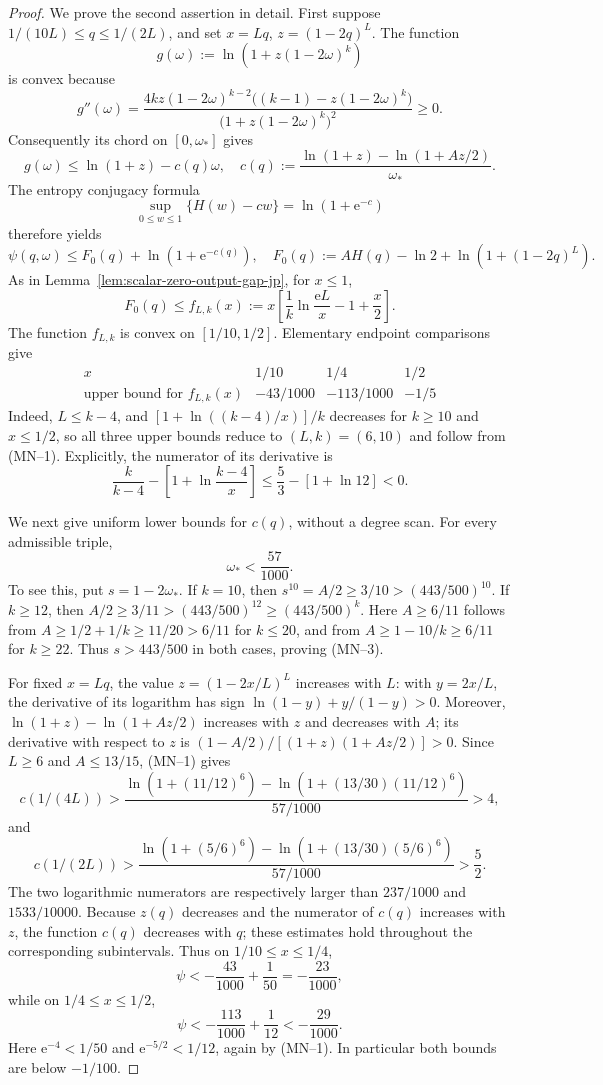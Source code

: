 \documentclass[10pt,a4paper]{amsart}
\begin{document}
\begin{proof}
We prove the second assertion in detail.  First suppose
\(1/(10L)\le q\le1/(2L)\), and set \(x=Lq\),
\(z=(1-2q)^L\).  The function
\[
g(\omega):=\ln\!\left(1+z(1-2\omega)^k\right)
\]
is convex because
\[
g''(\omega)=
\frac{4kz(1-2\omega)^{k-2}
\bigl((k-1)-z(1-2\omega)^k\bigr)}
{\bigl(1+z(1-2\omega)^k\bigr)^2}\ge0.
\]
Consequently its chord on \([0,\omega_*]\) gives
\[
g(\omega)\le\ln(1+z)-c(q)\omega,
\quad
c(q):=\frac{\ln(1+z)-\ln(1+Az/2)}{\omega_*}.
\]
The entropy conjugacy formula
\[
\sup_{0\le w\le1}\{H(w)-cw\}=\ln(1+\mathrm e^{-c})
\]
therefore yields
\[
\psi(q,\omega)
\le F_0(q)+\ln(1+\mathrm e^{-c(q)}),
\quad
F_0(q):=AH(q)-\ln2+\ln(1+(1-2q)^L).
\]
As in Lemma~\ref{lem:scalar-zero-output-gap-jp}, for \(x\le1\),
\[
F_0(q)\le
f_{L,k}(x):=
x\left[\frac1k\ln\frac{\mathrm eL}{x}-1+\frac x2\right].
\]
The function \(f_{L,k}\) is convex on \([1/10,1/2]\).  Elementary
endpoint comparisons give
\[
\begin{array}{c|ccc}
x&1/10&1/4&1/2\\ \hline
\text{upper bound for }f_{L,k}(x)&-43/1000&-113/1000&-1/5
\end{array}
\]
Indeed, \(L\le k-4\), and
\([1+\ln((k-4)/x)]/k\) decreases for \(k\ge10\) and
\(x\le1/2\), so all three upper bounds reduce to \((L,k)=(6,10)\)
and follow from (MN--1).
Explicitly, the numerator of its derivative is
\[
 \frac{k}{k-4}-\left[1+\ln\frac{k-4}{x}\right]
 \le\frac53-[1+\ln12]<0.
\]

We next give uniform lower bounds for \(c(q)\), without a degree scan.
For every admissible triple,
\[
 \omega_*<\frac{57}{1000}.                                  \tag{MN--3}
\]
To see this, put \(s=1-2\omega_*\).  If \(k=10\), then
\(s^{10}=A/2\ge3/10>(443/500)^{10}\).  If \(k\ge12\), then
\(A/2\ge3/11>(443/500)^{12}\ge(443/500)^k\).  Here
\(A\ge6/11\) follows from
\(A\ge1/2+1/k\ge11/20>6/11\) for \(k\le20\), and from
\(A\ge1-10/k\ge6/11\) for \(k\ge22\).  Thus
\(s>443/500\) in both cases, proving (MN--3).

For fixed \(x=Lq\), the value
\(z=(1-2x/L)^L\) increases with \(L\): with \(y=2x/L\), the derivative
of its logarithm has sign
\(\ln(1-y)+y/(1-y)>0\).  Moreover,
\(\ln(1+z)-\ln(1+Az/2)\) increases with \(z\) and decreases with
\(A\); its derivative with respect to \(z\) is
\((1-A/2)/[(1+z)(1+Az/2)]>0\).  Since \(L\ge6\) and
\(A\le13/15\), (MN--1) gives
\[
c(1/(4L))>
\frac{\ln(1+(11/12)^6)-\ln(1+(13/30)(11/12)^6)}{57/1000}>4,
\]
and
\[
c(1/(2L))>
\frac{\ln(1+(5/6)^6)-\ln(1+(13/30)(5/6)^6)}{57/1000}>\frac52.
\]
The two logarithmic numerators are respectively larger than
\(237/1000\) and \(1533/10000\).  Because \(z(q)\) decreases and the numerator
of \(c(q)\) increases with \(z\), the function \(c(q)\) decreases with \(q\);
these estimates hold throughout the corresponding subintervals.
Thus on \(1/10\le x\le1/4\),
\[
\psi<-\frac{43}{1000}+\frac1{50}=-\frac{23}{1000},
\]
while on \(1/4\le x\le1/2\),
\[
\psi<-\frac{113}{1000}+\frac1{12}< -\frac{29}{1000}.
\]
Here \(\mathrm e^{-4}<1/50\) and \(\mathrm e^{-5/2}<1/12\), again
by (MN--1).  In particular both bounds are below \(-1/100\).


\end{proof}
\end{document}
